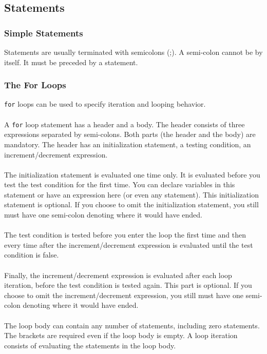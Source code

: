 \documentclass[12pt]{article}
\begin{document}
\subsection{Statements}

\subsubsection{Simple Statements}
Statements are usually terminated with semicolons (;). A semi-colon cannot be by itself. It must be preceded by a statement. 

\subsubsection{The For Loops}
\lstinline!for! loops can be used to specify iteration and looping behavior.\\
\\
A \lstinline!for! loop statement has a header and a body. The header consists of three expressions separated by semi-colons. Both parts (the header and the body) are mandatory. The header has an initialization statement, a testing condition, an increment/decrement expression.\\
\\
The initialization statement is evaluated one time only. It is evaluated before you test the test condition for the first time. You can declare variables in this statement or have an expression here (or even any statement). This initialization statement is optional. If you choose to omit the initialization statement, you still must have one semi-colon denoting where it would have ended.\\
\\
The test condition is tested before you enter the loop the first time and then every time after the increment/decrement expression is evaluated until the test condition is false.\\
\\
Finally, the increment/decrement expression is evaluated after each loop iteration, before the test condition is tested again. This part is optional. If you choose to omit the increment/decrement expression, you still must have one semi-colon denoting where it would have ended.\\
\\
The loop body can contain any number of statements, including zero statements. The brackets are required even if the loop body is empty. A loop iteration consists of evaluating the statements in the loop body. \\
\end{document}

